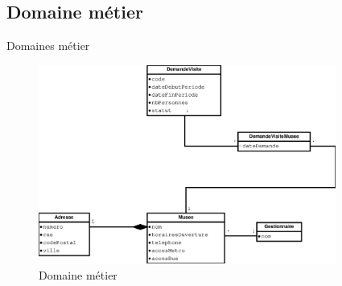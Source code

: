 \AntoineSpeak
\subsection{Domaine métier}
\begin{frame}{Domaines métier}
	\begin{figure}
		\centering
		\includegraphics[width=9.75cm]{images/new_database.eps}
		\caption{Domaine métier}
	\end{figure}
\end{frame}
